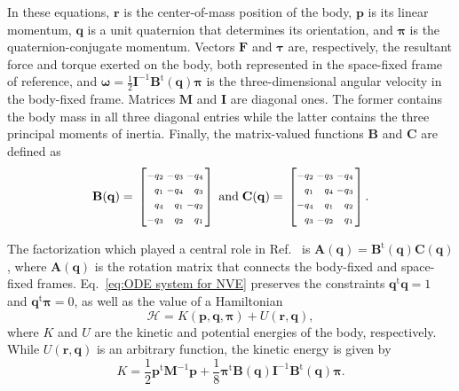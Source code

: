 \documentclass[
journal=jctcce,
layout=twocolumn
]{achemso}
\makeatletter
\newcommand{\mt}[1]{\boldsymbol{\mathbf{#1}}}   %
\newcommand{\vt}[1]{\boldsymbol{\mathbf{#1}}}   %
\newcommand{\tr}[1]{#1^\text{t}}                %
\newcommand{\Ham}[1]{{\mathcal H}_\text{#1}}    %
\newenvironment{smallarray}[1]                          %
{\null\,\vcenter\bgroup\scriptsize
	\renewcommand{\arraystretch}{1.5}
	\arraycolsep=.13885em
	\hbox\bgroup$\left[\array{@{}#1@{}}}
{\endarray\right]$\egroup\egroup\,\null}
\makeatother
\begin{document}
In these equations, $\vt r$ is the center-of-mass position of the body, $\vt p$ is its linear momentum, $\vt q$ is a unit quaternion that determines its orientation, and $\vt \pi$ is the quaternion-conjugate momentum.
Vectors $\vt F$ and $\vt \tau$ are, respectively, the resultant force and torque exerted on the body, both represented in the space-fixed frame of reference, and $\vt \omega = \frac{1}{2} {\mt I}^{-1} \tr{\mt B}(\vt q) {\vt \pi}$ is the three-dimensional angular velocity in the body-fixed frame.
Matrices $\mt M$ and $\mt I$ are diagonal ones.
The former contains the body mass in all three diagonal entries while the latter contains the three principal moments of inertia.
Finally, the matrix-valued functions $\mt B$ and $\vt C$ are defined as
\begin{equation*}
\label{eq:def_B_and_C}
\mt B(\vt q) = \begin{smallarray}{rrrr}
-q_2 & -q_3 & -q_4 \\
 q_1 & -q_4 &  q_3 \\
 q_4 &  q_1 & -q_2 \\
-q_3 &  q_2 &  q_1
\end{smallarray}
%
\; \text{and} \;
%
\mt C(\vt q) = \begin{smallarray}{rrrr}
-q_2 & -q_3 & -q_4 \\
 q_1 &  q_4 & -q_3 \\
-q_4 &  q_1 &  q_2 \\
 q_3 & -q_2 &  q_1
\end{smallarray}.
\end{equation*}

The factorization which played a central role in Ref.~ is ${\mt A}(\vt q) = \tr{\mt B}(\vt q) {\mt C}(\vt q)$, where ${\mt A}(\vt q)$ is the rotation matrix that connects the body-fixed and space-fixed frames. Eq.~\eqref{eq:ODE system for NVE} preserves the constraints $\tr{\vt q}{\vt q} = 1$ and $\tr{\vt q}{\vt \pi} = 0$, as well as the value of a Hamiltonian
\begin{equation}
\label{eq:Hamiltonian}
\Ham{} = K(\vt p, \vt q, \vt \pi) + U(\vt r,\vt q),
\end{equation}
where $K$ and $U$ are the kinetic and potential energies of the body, respectively.
While $U(\vt r, \vt q)$ is an arbitrary function, the kinetic energy is given by
\begin{equation}
\label{eq:kinetic energy}
K = \frac{1}{2} \tr{\vt p} {\mt M}^{-1} {\vt p} + \frac{1}{8} \tr{\vt \pi} {\mt B}(\vt q) {\mt I}^{-1} \tr{\mt B}(\vt q) {\vt \pi}.
\end{equation}
\end{document}
